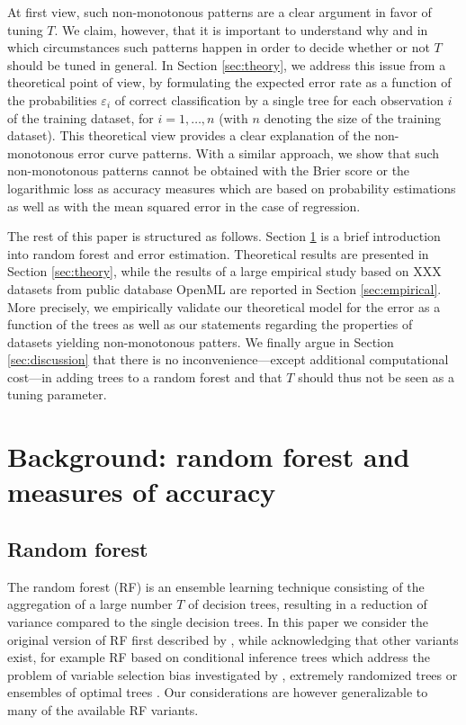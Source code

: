 \documentclass[paper=a4
               ,12pt
               ,DIV=12
               ,parskip=half
               ,titlepage=on
               ,headinclude 
               ,footinclude
               ,headsepline
               ,footsepline         %
               ,ilines 
               ]{scrartcl}
\begin{document}
At first view, such non-monotonous patterns are a clear argument in favor of tuning  $T$. We claim, however, that it is important to understand why and in which circumstances such patterns happen in order to decide 
whether or not $T$ should be tuned in general. In Section \ref{sec:theory}, we address this issue from a theoretical point of view, by formulating the expected error rate as a function of the probabilities $\varepsilon_i$ 
of correct classification by a single tree for each observation $i$ of the training dataset, for $i=1,\dots,n$ (with $n$ denoting the size of the training dataset). This theoretical view provides a clear explanation of the 
non-monotonous error curve patterns. With a similar approach, we show that such non-monotonous patterns cannot be obtained with the Brier score or the logarithmic loss as accuracy measures which are based on probability estimations as well as with the mean squared 
error in the case of regression.

The rest of this paper is structured as follows. Section \ref{sec:background} is a brief introduction into random forest and error estimation. Theoretical results are presented in Section \ref{sec:theory}, while the 
results of a large empirical study based on XXX datasets from public database OpenML \citep{OpenML2013} are reported in Section \ref{sec:empirical}. More precisely, we empirically validate our theoretical model for the 
error as a function of the trees as well as our statements regarding the properties of datasets yielding non-monotonous patters. We finally argue in Section \ref{sec:discussion} that there is no inconvenience---except 
additional computational cost---in adding trees to a random forest and that  $T$  should thus not be seen as a tuning parameter. 



\section{Background: random forest and measures of accuracy}
\label{sec:background}
\subsection{Random forest}
The random forest (RF) is an ensemble learning technique consisting of the aggregation of a large number $T$ of decision trees, resulting in a reduction of variance compared to the single decision trees. 
In this paper we consider the original version of RF first described by \citep{Breiman2001}, while acknowledging that other variants exist, for example RF based on conditional inference trees \citep{Hothorn2006} 
which address the problem of variable selection bias investigated by \citet{Strobl2007}, extremely randomized trees \citep{Geurts2006} or ensembles of optimal trees \citet{Khan2016}. Our considerations are 
however generalizable to many of the available RF variants.
\end{document}
